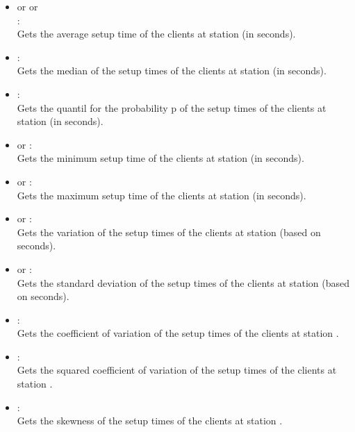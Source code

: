 \begin{itemize}

\item
{} or  or\\ :\\
Gets the average setup time of the clients at station  (in seconds).

\item
{}:\\
Gets the median of the setup times of the clients at station  (in seconds).

\item
{}:\\
Gets the quantil for the probability p of the setup times of the clients at station  (in seconds).

\item
{} or :\\  
Gets the minimum setup time of the clients at station  (in seconds).

\item
{} or :\\
Gets the maximum setup time of the clients at station  (in seconds).

\item
{} or :\\
Gets the variation of the setup times of the clients at station  (based on seconds).

\item
{} or :\\
Gets the standard deviation of the setup times of the clients at station  (based on seconds).

\item
{}:\\
Gets the coefficient of variation of the setup times of the clients at station . 

\item
{}:\\
Gets the squared coefficient of variation of the setup times of the clients at station .

\item
{}:\\
Gets the skewness of the setup times of the clients at station . 


\end{itemize}
